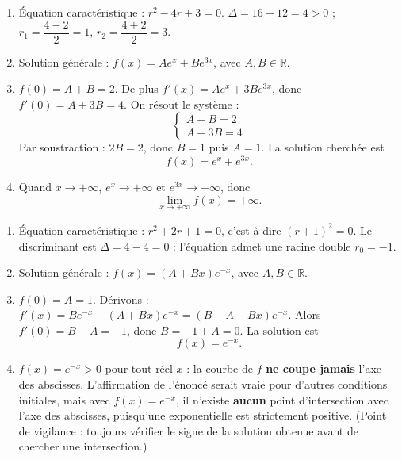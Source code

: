 \documentclass[11pt]{article}
\newcommand{\cle}[1]{{\popxbold\color{popdark}#1}}
\begin{document}
\begin{corrige}
\begin{enumerate}
\item Équation caractéristique : $r^2 - 4r + 3 = 0$. $\Delta = 16 - 12 = 4 > 0$ ; $r_1 = \dfrac{4 - 2}{2} = 1$, $r_2 = \dfrac{4 + 2}{2} = 3$.
\item Solution générale : $f(x) = Ae^{x} + Be^{3x}$, avec $A, B \in \mathbb{R}$.
\item $f(0) = A + B = 2$. De plus $f'(x) = Ae^{x} + 3Be^{3x}$, donc $f'(0) = A + 3B = 4$. On résout le système :
\[ \begin{cases} A + B = 2 \\ A + 3B = 4 \end{cases} \]
Par soustraction : $2B = 2$, donc $B = 1$ puis $A = 1$. La solution cherchée est
\[ f(x) = e^{x} + e^{3x}. \]
\item Quand $x \to +\infty$, $e^{x} \to +\infty$ et $e^{3x} \to +\infty$, donc
\[ \lim_{x \to +\infty} f(x) = +\infty. \]
\end{enumerate}
\end{corrige}

\begin{corrige}
\begin{enumerate}
\item Équation caractéristique : $r^2 + 2r + 1 = 0$, c'est-à-dire $(r + 1)^2 = 0$. Le discriminant est $\Delta = 4 - 4 = 0$ : l'équation admet une \cle{racine double} $r_0 = -1$.
\item Solution générale : $f(x) = (A + Bx)e^{-x}$, avec $A, B \in \mathbb{R}$.
\item $f(0) = A = 1$. Dérivons : $f'(x) = Be^{-x} - (A + Bx)e^{-x} = (B - A - Bx)e^{-x}$. Alors $f'(0) = B - A = -1$, donc $B = -1 + A = 0$. La solution est
\[ f(x) = e^{-x}. \]
\item $f(x) = e^{-x} > 0$ pour tout réel $x$ : la courbe de $f$ \textbf{ne coupe jamais} l'axe des abscisses. L'affirmation de l'énoncé serait vraie pour d'autres conditions initiales, mais avec $f(x) = e^{-x}$, il n'existe \textbf{aucun} point d'intersection avec l'axe des abscisses, puisqu'une exponentielle est strictement positive. (Point de vigilance : toujours vérifier le signe de la solution obtenue avant de chercher une intersection.)
\end{enumerate}
\end{corrige}
\end{document}
